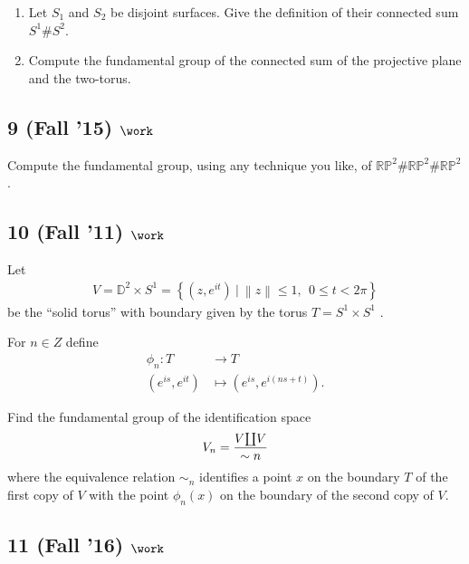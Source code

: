 \begin{enumerate}
\def\labelenumi{\alph{enumi}.}
\item
  Let \(S_1\) and \(S_2\) be disjoint surfaces. Give the definition of
  their connected sum \(S^1 \#S^2\).
\item
  Compute the fundamental group of the connected sum of the projective
  plane and the two-torus.
\end{enumerate}

\hypertarget{fall-15-work}{%
\subsection{\texorpdfstring{9 (Fall '15)
\(\work\)}{9 (Fall '15) \textbackslash work}}\label{fall-15-work}}

Compute the fundamental group, using any technique you like, of
\({\mathbb{RP}}^2 \#{\mathbb{RP}}^2 \#{\mathbb{RP}}^2\).

\hypertarget{fall-11-work}{%
\subsection{\texorpdfstring{10 (Fall '11)
\(\work\)}{10 (Fall '11) \textbackslash work}}\label{fall-11-work}}

Let
\begin{align*}
V = {\mathbb{D}}^2 \times S^1 = \left\{{ (z, e^{it}) {~\mathrel{\Big|}~}{\left\lVert {z} \right\rVert} \leq 1,~~ 0 \leq t < 2\pi}\right\}
\end{align*}
be the ``solid torus'' with boundary given by the torus
\(T = S^1 \times S^1\) .

For \(n \in Z\) define
\begin{align*} \phi_n : T &\to T \\ (e^{is} , e^{it} ) &\mapsto (e^{is} , e^{i(ns+t)}) .\end{align*}

Find the fundamental group of the identification space
\begin{align*}
V_n = {V{\coprod}V \over \sim n}
\end{align*}
where the equivalence relation \(\sim_n\) identifies a point \(x\) on
the boundary \(T\) of the first copy of \(V\) with the point
\(\phi_n (x)\) on the boundary of the second copy of \(V\).

\hypertarget{fall-16-work-3}{%
\subsection{\texorpdfstring{11 (Fall '16)
\(\work\)}{11 (Fall '16) \textbackslash work}}\label{fall-16-work-3}}

